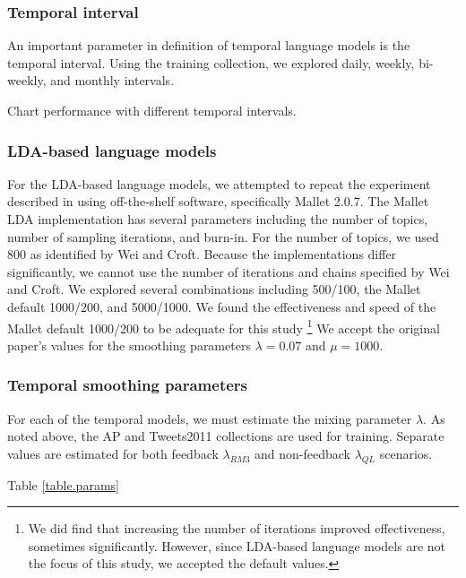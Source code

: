 \documentclass{sig-alternate}
\begin{document}
\subsubsection{Temporal interval}

An important parameter in definition of temporal language models is the temporal interval.  Using the training collection, we explored  daily, weekly, bi-weekly, and monthly intervals.

Chart performance with different temporal intervals.

\subsubsection{LDA-based language models}

For the LDA-based language models, we attempted to repeat the experiment described in \cite{Wei2006} using off-the-shelf software, specifically Mallet 2.0.7. The Mallet LDA implementation
has several parameters including the number of topics, number of sampling iterations, and burn-in. For the number of topics, we used 800 as identified by Wei and Croft. Because the implementations
differ significantly, we cannot use the number of iterations and chains specified by Wei and Croft. We explored several combinations including 500/100, the Mallet default 1000/200, and 5000/1000. 
We found the effectiveness and speed of the Mallet default 1000/200 to be adequate for this study \footnote{We did find that increasing the number of iterations improved effectiveness, sometimes significantly. However, since 
LDA-based language models are not the focus of this study, we accepted the default values.}  We accept the original paper's values for the smoothing parameters $\lambda=0.07$ and $\mu=1000$.

\subsubsection{Temporal smoothing parameters}

For each of the temporal models, we must estimate the mixing parameter $\lambda$.  As noted above, the AP and Tweets2011 collections are used for training. Separate values are estimated for 
both feedback $\lambda_{RM3}$ and non-feedback $\lambda_{QL}$ scenarios.

Table \ref{table.params}
\end{document}
